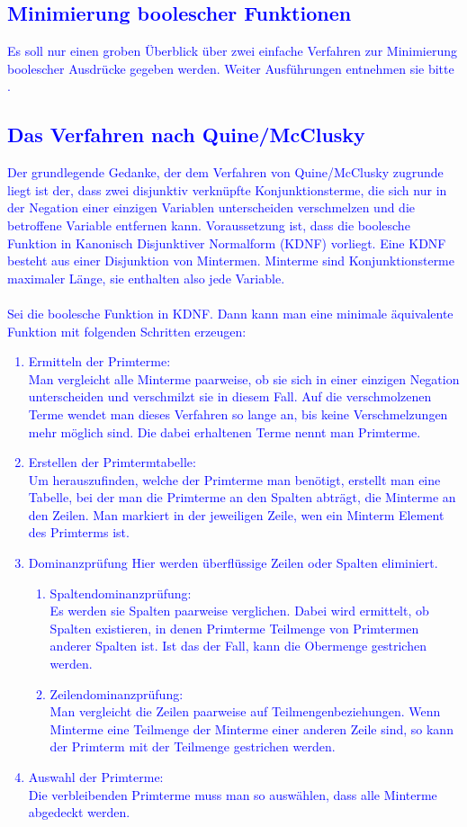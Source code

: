 \documentclass[a4paper, 11pt]{book}
\begin{document}
\textcolor{blue}{
\chapter{Minimierung boolescher Funktionen} \label{Minimierung}
Es soll nur einen groben Überblick über zwei einfache Verfahren zur Minimierung boolescher Ausdrücke gegeben werden. Weiter Ausführungen entnehmen sie bitte \cite{G01}.
\section{Das Verfahren nach Quine/McClusky} \label{Min_QMC} 
Der grundlegende Gedanke, der dem Verfahren von Quine/McClusky zugrunde liegt ist der, dass zwei disjunktiv verknüpfte  Konjunktionsterme, die sich nur in der Negation einer einzigen Variablen unterscheiden verschmelzen und die betroffene Variable entfernen kann. Voraussetzung ist, dass die boolesche Funktion in Kanonisch Disjunktiver Normalform (KDNF) vorliegt. Eine KDNF besteht aus einer Disjunktion von Mintermen. Minterme sind Konjunktionsterme maximaler Länge, sie enthalten also jede Variable.\\
\\
Sei die boolesche Funktion in KDNF. Dann kann man eine minimale äquivalente Funktion mit folgenden Schritten erzeugen:
\begin{enumerate}
	\item Ermitteln der Primterme:\\
	Man vergleicht alle Minterme paarweise, ob sie sich in einer einzigen Negation unterscheiden und verschmilzt sie in diesem Fall. Auf die verschmolzenen Terme wendet man dieses Verfahren so lange an, bis keine Verschmelzungen mehr möglich sind. Die dabei erhaltenen Terme nennt man Primterme.
	\item Erstellen der Primtermtabelle:\\
	Um herauszufinden, welche der Primterme man benötigt, erstellt man eine Tabelle, bei der man die Primterme an den Spalten abträgt, die Minterme an den Zeilen. Man markiert in der jeweiligen Zeile, wen ein Minterm Element des Primterms ist.
	\item Dominanzprüfung
	Hier werden überflüssige Zeilen oder Spalten eliminiert. 
	\begin{enumerate}
		\item Spaltendominanzprüfung:\\
		Es werden sie Spalten paarweise verglichen. Dabei wird ermittelt, ob Spalten existieren, in denen Primterme Teilmenge von Primtermen anderer Spalten ist. Ist das der Fall, kann die Obermenge gestrichen werden. 
		\item Zeilendominanzprüfung:\\
		Man vergleicht die Zeilen paarweise auf Teilmengenbeziehungen. Wenn Minterme eine Teilmenge der Minterme einer anderen Zeile sind, so kann der Primterm mit der Teilmenge gestrichen werden. 
	\end{enumerate}
	\item Auswahl der Primterme:\\
	Die verbleibenden Primterme muss man so auswählen, dass alle Minterme abgedeckt werden. 
\end{enumerate}
}
\end{document}
